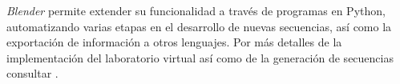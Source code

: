 \textit{Blender} permite extender su funcionalidad a través de programas en Python, automatizando varias etapas en el desarrollo de nuevas secuencias, así como la exportación de información a otros lenguajes. Por más detalles de la implementación del laboratorio virtual así como de la generación de secuencias consultar \cite{proyecto_biomecanica}.
%
%
%
%
%
       
